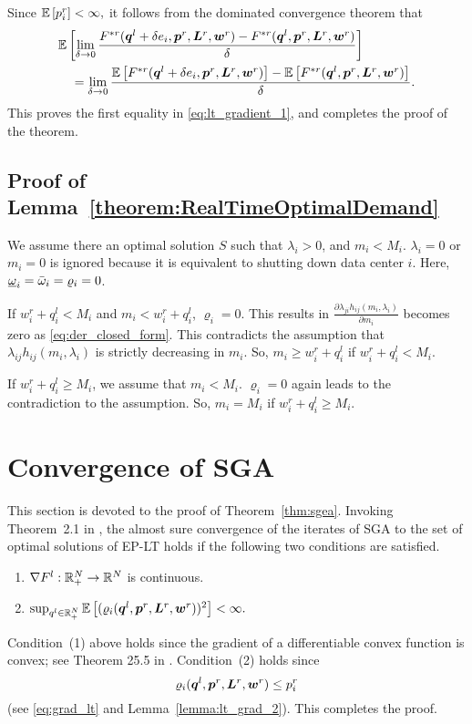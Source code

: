 Since $\mathbb{E}\left[p^r_i\right] < \infty,$ it follows from the dominated
convergence theorem that 
\begin{align*}
  &\mathbb{E}\left[\lim_{\delta \rightarrow 0} \frac{F^{*r}(\boldsymbol{q}^l + \delta
      e_i,\boldsymbol{p}^r,\boldsymbol{L}^r,\boldsymbol{w}^r) -
      F^{*r}(\boldsymbol{q}^l,\boldsymbol{p}^r,\boldsymbol{L}^r,\boldsymbol{w}^r)}{\delta}\right] \\
  &\quad =\lim_{\delta \rightarrow 0} \frac{\mathbb{E}\left[F^{*r}(\boldsymbol{q}^l + \delta
      e_i,\boldsymbol{p}^r,\boldsymbol{L}^r,\boldsymbol{w}^r)\right] -
    \mathbb{E}\left[F^{*r}(\boldsymbol{q}^l,\boldsymbol{p}^r,\boldsymbol{L}^r,\boldsymbol{w}^r)\right]}{\delta}.
\end{align*}
This proves the first equality in \eqref{eq:lt_gradient_1}, and
completes the proof of the theorem.


\subsection{Proof of Lemma~\ref{theorem:RealTimeOptimalDemand}}
\label{proof:RealTimeOptimalDemand}

 We assume there an optimal solution $S$ such that $\lambda_i>0$, and $m_i < M_i$. $\lambda_i=0$ or $m_i=0$ is ignored
 because it is equivalent to shutting down data center $i$.
 Here, $\underbar{$\omega$}_i=\bar{\omega}_i=\varrho_i = 0$.
 
 If $w^r_i + q^l_i < M_i$ and $m_i < w^r_i + q^l_i$,
 $\varrho_i = 0$. This results in $\frac{\partial \lambda_{ji} h_{ij}(m_i,\lambda_i)}{\partial m_i}$ becomes zero as \eqref{eq:der_closed_form}. This contradicts the assumption that $\lambda_{ij}h_{ij}(m_i,\lambda_i)$ is strictly decreasing in $m_i$. So, $m_i \geq w^r_i+q^l_i$ if $w^r_i + q^l_i < M_i$. 
 
 If $w^r_i + q^l_i \geq M_i$, we assume that $m_i < M_i$.
 $\varrho_i = 0$ again leads to the contradiction to the assumption. So, $m_i = M_i$ if $w^r_i + q^l_i \geq M_i$.

\section{Convergence of SGA}
\label{sec:conv-proof}

This section is devoted to the proof of Theorem~\ref{thm:sgea}.
Invoking Theorem~2.1 in \cite{Kushner03}, the almost sure convergence
of the iterates of SGA to the set of optimal solutions of EP-LT holds
if the following two conditions are satisfied.
  \begin{enumerate}
  \item $\nabla F^l:\mathbb{R}^N_+ \rightarrow \mathbb{R}^N$ is continuous.
  \item $ \sup_{q^l \in \mathbb{R}^N_+}
    \mathbb{E}\left[(\varrho_i(\boldsymbol{q}^l,\boldsymbol{p}^r,\boldsymbol{L}^r,\boldsymbol{w}^r))^2\right]
    < \infty.$
  \end{enumerate}
  Condition~(1) above holds since the gradient of a differentiable
  convex function is convex; see Theorem 25.5 in
  \cite{Rockafellar70}. Condition~(2) holds since $$
  \varrho_i(\boldsymbol{q}^l,\boldsymbol{p}^r,\boldsymbol{L}^r,\boldsymbol{w}^r) \leq
  p^r_i$$ (see \eqref{eq:grad_lt} and
  Lemma~\ref{lemma:lt_grad_2}). This completes the proof.



